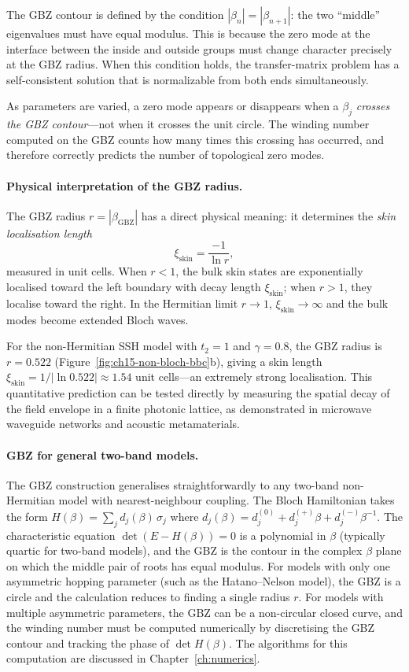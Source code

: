 The GBZ contour is defined by the condition $|\beta_n| = |\beta_{n+1}|$:
the two ``middle'' eigenvalues must have equal modulus. This is
because the zero mode at the interface between the inside and outside
groups must change character precisely at the GBZ radius. When this
condition holds, the transfer-matrix problem has a self-consistent
solution that is normalizable from both ends simultaneously.

As parameters are varied, a zero mode appears or disappears when a
$\beta_j$ \emph{crosses the GBZ contour}---not when it crosses the unit
circle. The winding number computed on the GBZ counts how many times
this crossing has occurred, and therefore correctly predicts the number
of topological zero modes.

\paragraph{Physical interpretation of the GBZ radius.}
The GBZ radius $r = |\beta_{\mathrm{GBZ}}|$ has a direct physical
meaning: it determines the \emph{skin localisation length}
\begin{equation}
 \xi_{\mathrm{skin}} = \frac{-1}{\ln r},
 \label{eq:skin-length-from-gbz}
\end{equation}
measured in unit cells. When $r < 1$, the bulk skin states are
exponentially localised toward the left boundary with decay length
$\xi_{\mathrm{skin}}$; when $r > 1$, they localise toward the right.
In the Hermitian limit $r \to 1$, $\xi_{\mathrm{skin}} \to \infty$ and
the bulk modes become extended Bloch waves.

For the non-Hermitian SSH model with $t_2 = 1$ and $\gamma = 0.8$, the
GBZ radius is $r = 0.522$ (Figure~\ref{fig:ch15-non-bloch-bbc}b),
giving a skin length $\xi_{\mathrm{skin}} = 1/|\ln 0.522| \approx
1.54$ unit cells---an extremely strong localisation. This quantitative
prediction can be tested directly by measuring the spatial decay of the
field envelope in a finite photonic lattice, as demonstrated in
microwave waveguide networks and acoustic metamaterials.

\paragraph{GBZ for general two-band models.}
The GBZ construction generalises straightforwardly to any two-band
non-Hermitian model with nearest-neighbour coupling. The Bloch
Hamiltonian takes the form
$H(\beta) = \sum_j d_j(\beta)\,\sigma_j$ where
$d_j(\beta) = d_j^{(0)} + d_j^{(+)}\beta + d_j^{(-)}\beta^{-1}$.
The characteristic equation $\det(E - H(\beta)) = 0$ is a polynomial
in $\beta$ (typically quartic for two-band models), and the GBZ is
the contour in the complex $\beta$ plane on which the middle pair
of roots has equal modulus. For models with only one asymmetric
hopping parameter (such as the Hatano--Nelson model), the GBZ is a
circle and the calculation reduces to finding a single radius $r$.
For models with multiple asymmetric parameters, the GBZ can be a
non-circular closed curve, and the winding number must be computed
numerically by discretising the GBZ contour and tracking the phase
of $\det H(\beta)$. The algorithms for this computation are
discussed in Chapter~\ref{ch:numerics}.

